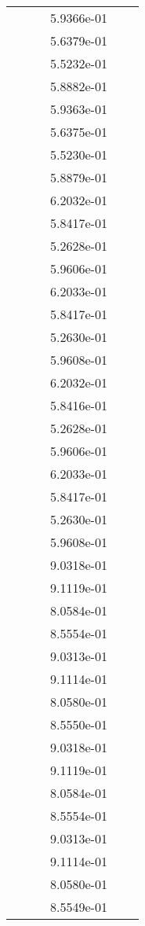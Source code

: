 \begin{xltabular}{\textwidth}{r|rS[table-format=1.3e+2]S[table-format=1.4e+2]S[table-format=1.4e+2]S[table-format=-1.5]}
&  &  & 5.9366e-01 & & \\
&  &  & 5.6379e-01 & & \\
&  &  & 5.5232e-01 & & \\
&  &  & 5.8882e-01 & & \\
&  &  & 5.9363e-01 & & \\
&  &  & 5.6375e-01 & & \\
&  &  & 5.5230e-01 & & \\
&  &  & 5.8879e-01 & & \\
&  &  & 6.2032e-01 & & \\
&  &  & 5.8417e-01 & & \\
&  &  & 5.2628e-01 & & \\
&  &  & 5.9606e-01 & & \\
&  &  & 6.2033e-01 & & \\
&  &  & 5.8417e-01 & & \\
&  &  & 5.2630e-01 & & \\
&  &  & 5.9608e-01 & & \\
&  &  & 6.2032e-01 & & \\
&  &  & 5.8416e-01 & & \\
&  &  & 5.2628e-01 & & \\
&  &  & 5.9606e-01 & & \\
&  &  & 6.2033e-01 & & \\
&  &  & 5.8417e-01 & & \\
&  &  & 5.2630e-01 & & \\
&  &  & 5.9608e-01 & & \\
&  &  & 9.0318e-01 & & \\
&  &  & 9.1119e-01 & & \\
&  &  & 8.0584e-01 & & \\
&  &  & 8.5554e-01 & & \\
&  &  & 9.0313e-01 & & \\
&  &  & 9.1114e-01 & & \\
&  &  & 8.0580e-01 & & \\
&  &  & 8.5550e-01 & & \\
&  &  & 9.0318e-01 & & \\
&  &  & 9.1119e-01 & & \\
&  &  & 8.0584e-01 & & \\
&  &  & 8.5554e-01 & & \\
&  &  & 9.0313e-01 & & \\
&  &  & 9.1114e-01 & & \\
&  &  & 8.0580e-01 & & \\
&  &  & 8.5549e-01 & & \\

\end{xltabular}
